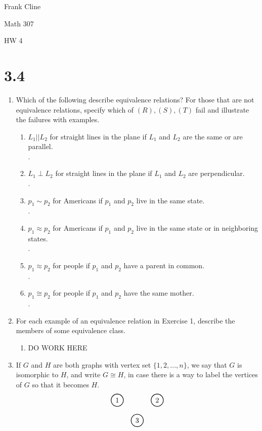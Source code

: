 \documentclass[11pt]{article}
\begin{document}
\onehalfspacing
\hfill Frank Cline

\hfill Math 307

\hfill HW 4


\section*{3.4}
\begin{enumerate}
\item Which of the following describe equivalence relations? For those that are not equivalence relations, specify which of $(R),(S),(T)$ fail and illustrate the failures with examples.
	\begin{enumerate}
	\item $L_1||L_2$ for straight lines in the plane if $L_1$ and $L_2$ are the same or are parallel.\\
	.
	\item $L_1\perp L_2$ for straight lines in the plane if $L_1$ and $L_2$ are perpendicular.\\
	.
	\item $p_1\sim p_2$ for Americans if $p_1$ and $p_2$ live in the same state.\\
	.
	\item $p_1\approx p_2$ for Americans if $p_1$ and $p_2$ live in the same state or in neighboring 
	states.\\
	.
	\item $p_1\approx p_2$ for people if $p_1$ and $p_2$ have a parent in common.\\
	.
	\item $p_1\cong p_2$ for people if $p_1$ and $p_2$ have the same mother.\\
	.
	\end{enumerate}
\item For each example of an equivalence relation in Exercise 1, describe the members of some equivalence class.
	\begin{enumerate}
	\item  DO WORK HERE
	\end{enumerate}
\setcounter{enumi}{4}
\item If $G$ and $H$ are both graphs with vertex set $\{1,2,...,n\}$, we say that $G$ is isomorphic to $H$, and write $G\cong H$, in case there is a way to label the vertices of $G$ so that it becomes $H$.
\[
	\begin{tikzpicture}
	\begin{scope}[every node/.style={circle,thick,draw}]
	    \node (1) at (0,0) {$1$};
	    \node (2) at (2,0) {$2$};
	    \node (3) at (1,-1) {$3$};
	\end{scope}
	

\end{tikzpicture}\]
\end{enumerate}
\end{document}
